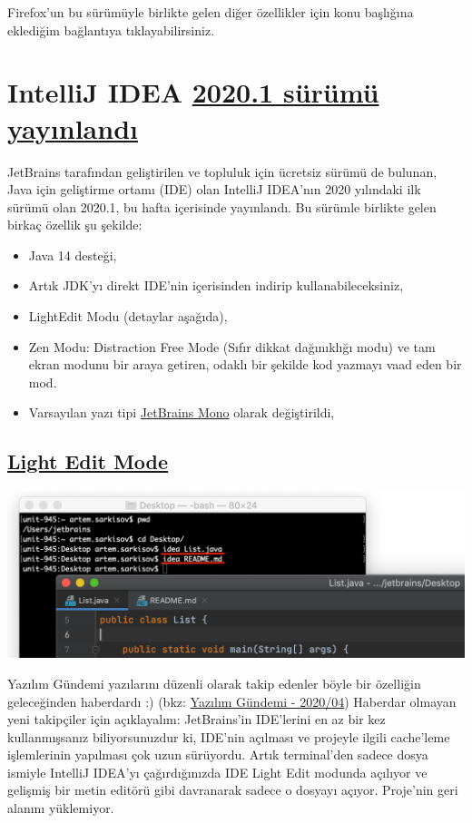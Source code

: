 \documentclass[11pt]{article}
\begin{document}
Firefox'un bu sürümüyle birlikte gelen diğer özellikler için konu başlığına
eklediğim bağlantıya tıklayabilirsiniz.
\section{IntelliJ IDEA \href{https://blog.jetbrains.com/idea/2020/04/intellij-idea-2020-1-released/}{2020.1 sürümü yayınlandı}}
\label{sec:org35f0c96}
JetBrains tarafından geliştirilen ve topluluk için ücretsiz sürümü de bulunan,
Java için geliştirme ortamı (IDE) olan IntelliJ IDEA'nın 2020 yılındaki ilk
sürümü olan 2020.1, bu hafta içerisinde yayınlandı. Bu sürümle birlikte gelen
birkaç özellik şu şekilde:

\begin{itemize}
\item Java 14 desteği,
\item Artık JDK'yı direkt IDE'nin içerisinden indirip kullanabileceksiniz,
\item LightEdit Modu (detaylar aşağıda),
\item Zen Modu: Distraction Free Mode (Sıfır dikkat dağınıklığı modu) ve tam
ekran modunu bir araya getiren, odaklı bir şekilde kod yazmayı vaad eden
bir mod.
\item Varsayılan yazı tipi \href{http://jetbrains.com/lp/mono/}{JetBrains Mono} olarak değiştirildi,
\end{itemize}

\subsection{\href{https://blog.jetbrains.com/idea/2020/04/lightedit-mode/}{Light Edit Mode}}
\label{sec:org2a725d8}
\begin{center}
\includegraphics[width=.9\linewidth]{gorseller/intellij-idea-lightedit-terminal.png}
\end{center}

Yazılım Gündemi yazılarını düzenli olarak takip edenler böyle bir özelliğin
geleceğinden haberdardı :) (bkz: \href{../04/yazilim-gundemi-2020-04.pdf}{Yazılım Gündemi - 2020/04}) Haberdar olmayan
yeni takipçiler için açıklayalım: JetBrains'in IDE'lerini en az bir kez
kullanmışsanız biliyorsunuzdur ki, IDE'nin açılması ve projeyle ilgili
cache'leme işlemlerinin yapılması çok uzun sürüyordu. Artık terminal'den
sadece dosya ismiyle IntelliJ IDEA'yı çağırdığınızda IDE Light Edit modunda
açılıyor ve gelişmiş bir metin editörü gibi davranarak sadece o dosyayı
açıyor. Proje'nin geri alanını yüklemiyor.
\end{document}
